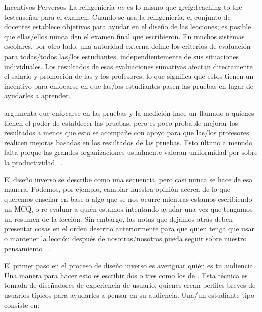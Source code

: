\begin{aside}{Incentivos Perversos}
La reingeniería \emph{no} es lo mismo que gref{g:teaching-to-the-test}{enseñar para el examen}.
Cuando se usa la reingeniería,
el conjunto de docentes establece objetivos para ayudar en el diseño de las lecciones;
es posible que ellas/ellos nunca den el examen final que escribieron.
En muchos sistemas escolares,
por otro lado,
una autoridad externa define los criterios de evaluación para todas/todos las/los estudiantes,
independientemente de sus situaciones individuales.
Los resultados de esas evaluaciones sumativas afectan directamente el salario y promoción de las y los profesores,
lo que significa que estos tienen un incentivo para enfocarse en que las/los estudiantes pasen las pruebas en lugar de ayudarles a aprender.
  
\cite{Gree2014} argumenta que enfocarse en las pruebas y la medición hace un llamado a quienes tienen el poder de establecer las  pruebas, pero es poco probable mejorar los resultados
a menos que esto se acompañe con apoyo para que las/los profesores realicen mejoras basadas en los resultados de las pruebas.
Esto último a menudo falta porque
las grandes organizaciones usualmente valoran uniformidad por sobre la productividad ~\cite{Scot1998}.
\end{aside}
 
El diseño inverso se describe como una secuencia,
pero casi nunca se hace de esa manera.
Podemos,
por ejemplo, cambiar nuestra opinión acerca de lo que queremos enseñar
en base a algo que se nos ocurre mientras estamos escribiendo un MCQ,
o re-evaluar a quién estamos intentando ayudar una vez que tengamos un resumen de la lección.
Sin embargo,
las notas que dejamos atrás deben presentar cosas en el orden descrito anteriormente para que quien tenga que usar o mantener la lección después de nosotras/nosotros pueda seguir sobre nuestro pensamiento
~\cite{Parn1986}.
  
 
El primer paso en el proceso de diseño inverso es averiguar quién es tu audiencia.
Una manera para hacer esto es escribir dos o tres
como los de .
Esta técnica es tomada de diseñadores de experiencia de usuario,
quienes crean perfiles breves de usuarios típicos
para ayudarles a pensar en su audiencia.
Una/un estudiante tipo consiste en:
 

